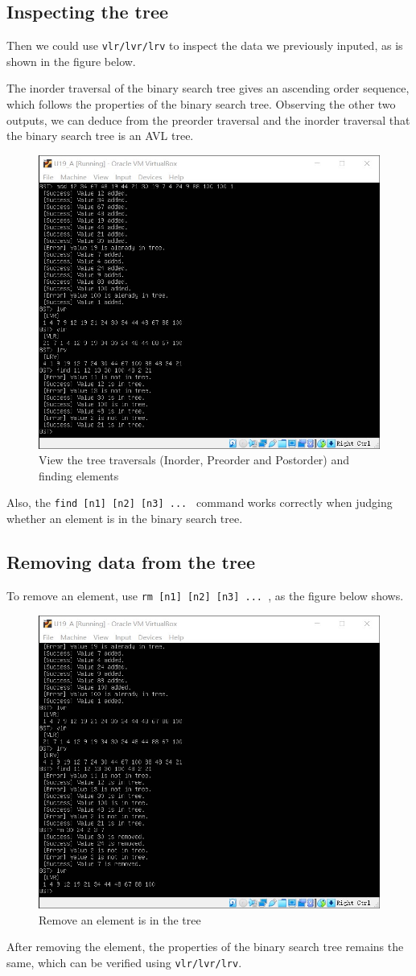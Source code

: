 \documentclass[cn,black,12pt,normal]{elegantnote}
\begin{document}
\subsection{Inspecting the tree}
Then we could use \lstinline{vlr/lvr/lrv} to inspect the data we previously inputed, as is shown in the figure below.

The inorder traversal of the binary search tree gives an ascending order sequence, which follows the properties of the binary search tree. Observing the other two outputs, we can deduce from the preorder traversal and the inorder traversal that the binary search tree is an AVL tree.
\begin{figure}[H]
    \centering
    \includegraphics[width=0.7\linewidth]{image/avl_04.jpg}
    \caption{View the tree traversals (Inorder, Preorder and Postorder) and finding elements}
\end{figure}

Also, the \lstinline{find [n1] [n2] [n3] ... } command works correctly when judging whether an element is in the binary search tree.


\subsection{Removing data from the tree}
To remove an element, use \lstinline{rm [n1] [n2] [n3] ... }, as the figure below shows.
\begin{figure}[H]
    \centering
    \includegraphics[width=0.7\linewidth]{image/avl_05.jpg}
    \caption{Remove an element is in the tree}
\end{figure}
After removing the element, the properties of the binary search tree remains the same, which can be verified using \lstinline{vlr/lvr/lrv}.
\end{document}
